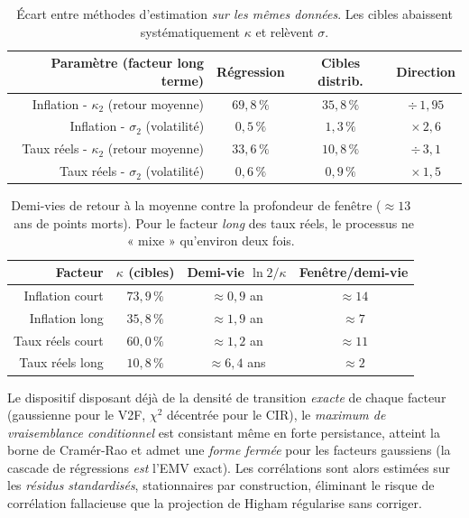 \documentclass[11pt,a4paper]{article}
\renewcommand{\arraystretch}{1.4}
\newcommand{\tablehead}[1]{\textcolor{nxnavy}{\sffamily\bfseries\small #1}}
\begin{document}
\begin{table}[H]
\centering\small
\renewcommand{\arraystretch}{1.4}\setlength{\tabcolsep}{6pt}
\begin{tabularx}{\linewidth}{R C C C}
\toprule
\tablehead{Paramètre (facteur long terme)} & \tablehead{Régression} & \tablehead{Cibles distrib.} & \tablehead{Direction} \\
\midrule
{} Inflation - $\kappa_2$ (retour moyenne) & $69{,}8\,\%$ & $35{,}8\,\%$ & $\div\,1{,}95$ \\
Inflation - $\sigma_2$ (volatilité) & $0{,}5\,\%$ & $1{,}3\,\%$ & $\times\,2{,}6$ \\
 Taux réels - $\kappa_2$ (retour moyenne) & $33{,}6\,\%$ & $10{,}8\,\%$ & $\div\,3{,}1$ \\
Taux réels - $\sigma_2$ (volatilité) & $0{,}6\,\%$ & $0{,}9\,\%$ & $\times\,1{,}5$ \\
\bottomrule
\end{tabularx}
\caption{Écart entre méthodes d'estimation \emph{sur les mêmes données}. Les cibles abaissent systématiquement $\kappa$ et relèvent $\sigma$.}
\label{tab:p3-instab}
\end{table}

\begin{table}[H]
\centering\small
\renewcommand{\arraystretch}{1.4}\setlength{\tabcolsep}{6pt}
\begin{tabularx}{\linewidth}{R C C C}
\toprule
\tablehead{Facteur} & \tablehead{$\kappa$ (cibles)} & \tablehead{Demi-vie $\ln 2/\kappa$} & \tablehead{Fenêtre/demi-vie} \\
\midrule
{} Inflation court & $73{,}9\,\%$ & $\approx 0{,}9$ an & $\approx 14$ \\
Inflation long & $35{,}8\,\%$ & $\approx 1{,}9$ an & $\approx 7$ \\
 Taux réels court & $60{,}0\,\%$ & $\approx 1{,}2$ an & $\approx 11$ \\
Taux réels long & $10{,}8\,\%$ & $\approx 6{,}4$ ans & $\approx 2$ \\
\bottomrule
\end{tabularx}
\caption{Demi-vies de retour à la moyenne contre la profondeur de fenêtre ($\approx 13$~ans de points morts). Pour le facteur \emph{long} des taux réels, le processus ne « mixe » qu'environ deux fois.}
\label{tab:p3-halflife}
\end{table}

Le dispositif disposant déjà de la densité de transition \emph{exacte} de chaque facteur (gaussienne pour le V2F, $\chi^2$ décentrée pour le CIR), le \emph{maximum de vraisemblance conditionnel} est consistant même en forte persistance, atteint la borne de Cramér-Rao et admet une \emph{forme fermée} pour les facteurs gaussiens (la cascade de régressions \emph{est} l'EMV exact). Les corrélations sont alors estimées sur les \emph{résidus standardisés}, stationnaires par construction, éliminant le risque de corrélation fallacieuse que la projection de Higham régularise sans corriger.
\end{document}
